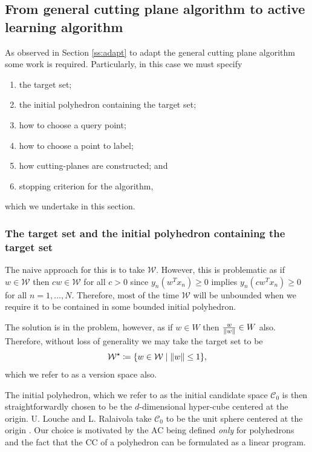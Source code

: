\documentclass[11pt]{amsart}
\theoremstyle{definition}
\theoremstyle{remark}
\newcommand{\transpose}{T}
\begin{document}
    \subsection{From general cutting plane algorithm to active learning algorithm}
        As observed in Section \ref{ss:adapt} to adapt the general cutting plane algorithm some work is required. Particularly, in this case we must specify
        \begin{enumerate}
            \item the target set;
            \item the initial polyhedron containing the target set;
            \item how to choose a query point;
            \item how to choose a point to label;
            \item how cutting-planes are constructed; and 
            \item stopping criterion for the algorithm,
        \end{enumerate}
        which we undertake in this section. 

            \subsubsection*{The target set and the initial polyhedron containing the target set} The naive approach for this is to take $\mathcal{W}$. However, this is problematic as if $w \in \mathcal{W}$ then $cw \in \mathcal{W}$ for all $c>0$ since $y_n (w^\transpose x_n) \geq 0$ implies $y_n (cw^\transpose x_n) \geq 0$ for all $n = 1, \dots, N$. Therefore, most of the time $\mathcal{W}$ will be unbounded when we require it to be contained in some bounded initial polyhedron. 

            The solution is in the problem, however, as if $w \in W$ then $\frac{w}{\norm{w}} \in W$ also. Therefore, without loss of generality we may take the target set to be
            \begin{equation*}
                \mathcal{W}^\star \coloneqq \{w \in \mathcal{W} \;|\; \norm{w} \leq 1\},
            \end{equation*}
            which we refer to as a version space also.

            The initial polyhedron, which we refer to as the initial candidate space $\mathcal{C}_0$ is then straightforwardly chosen to be the $d$-dimensional hyper-cube centered at the origin. U. Louche and L. Ralaivola take $\mathcal{C}_0$ to be the unit sphere centered at the origin \cite[Section II.B]{LR15}. Our choice is motivated by the AC being defined \emph{only} for polyhedrons and the fact that the CC of a polyhedron can be formulated as a linear program.
\end{document}
